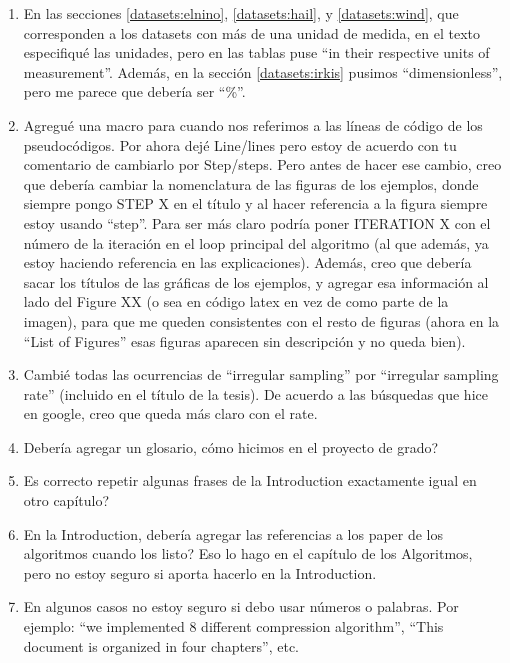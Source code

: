 \begin{enumerate}

\item En las secciones \ref{datasets:elnino}, \ref{datasets:hail}, y \ref{datasets:wind}, que corresponden a los datasets con más de una unidad de medida, en el texto especifiqué las unidades, pero en las tablas puse ``in their respective units of measurement''. Además, en la sección \ref{datasets:irkis} pusimos ``dimensionless'', pero me parece que debería ser ``\%''.

\item Agregué una macro para cuando nos referimos a las líneas de código de los pseudocódigos. Por ahora dejé Line/lines pero estoy de acuerdo con tu comentario de cambiarlo por Step/steps. Pero antes de hacer ese cambio, creo que debería cambiar la nomenclatura de las figuras de los ejemplos, donde siempre pongo STEP X en el título y al hacer referencia a la figura siempre estoy usando ``step''. Para ser más claro podría poner ITERATION X con el número de la iteración en el loop principal del algoritmo (al que además, ya estoy haciendo referencia en las explicaciones). Además, creo que debería sacar los títulos de las gráficas de los ejemplos, y agregar esa información al lado del Figure XX (o sea en código latex en vez de como parte de la imagen), para que me queden consistentes con el resto de figuras (ahora en la ``List of Figures'' esas figuras aparecen sin descripción y no queda bien).

\item Cambié todas las ocurrencias de ``irregular sampling'' por ``irregular sampling rate'' (incluido en el título de la tesis). De acuerdo a las búsquedas que hice en google, creo que queda más claro con el rate.

\item Debería agregar un glosario, cómo hicimos en el proyecto de grado?

\item Es correcto repetir algunas frases de la Introduction exactamente igual en otro capítulo?

\item En la Introduction, debería agregar las referencias a los paper de los algoritmos cuando los listo? Eso lo hago en el capítulo de los Algoritmos, pero no estoy seguro si aporta hacerlo en la Introduction.

\item En algunos casos no estoy seguro si debo usar números o palabras. Por ejemplo: ``we implemented 8 different compression algorithm'', ``This document is organized in four chapters'', etc.


\end{enumerate}
